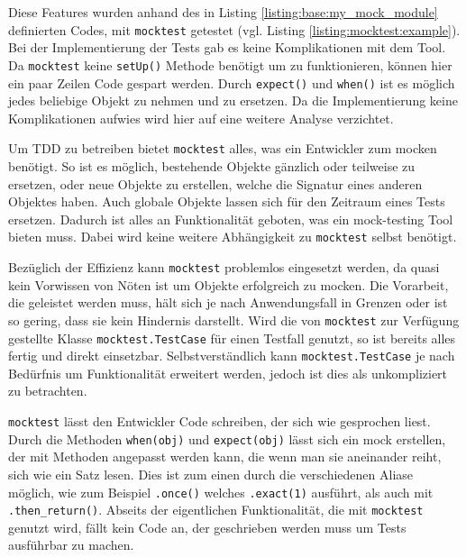Diese Features wurden anhand des in Listing \ref{listing:base:my_mock_module}
definierten Codes, mit \lstinline{mocktest} getestet (vgl. Listing
\ref{listing:mocktest:example}). Bei der Implementierung der Tests gab es keine
Komplikationen mit dem Tool. Da \lstinline{mocktest} keine \lstinline{setUp()}
Methode benötigt um zu funktionieren, können hier ein paar Zeilen Code gespart
werden. Durch \lstinline{expect()} und \lstinline{when()} ist es möglich jedes
beliebige Objekt zu nehmen und zu ersetzen. Da die Implementierung keine
Komplikationen aufwies wird hier auf eine weitere Analyse verzichtet.
\newline

Um TDD zu betreiben bietet \lstinline{mocktest} alles, was ein Entwickler zum
\Gls{mock}en benötigt. So ist es möglich, bestehende Objekte gänzlich oder
teilweise zu ersetzen, oder neue Objekte zu erstellen, welche die Signatur eines
anderen Objektes haben. Auch globale Objekte lassen sich für den Zeitraum eines
Tests ersetzen. Dadurch ist alles an Funktionalität geboten, was ein
\gls{mock}-testing Tool bieten muss. Dabei wird keine weitere Abhängigkeit zu
\lstinline{mocktest} selbst benötigt.

Bezüglich der Effizienz kann \lstinline{mocktest} problemlos eingesetzt werden,
da quasi kein Vorwissen von Nöten ist um Objekte erfolgreich zu \gls{mock}en.
Die Vorarbeit, die geleistet werden muss, hält sich je nach Anwendungsfall in
Grenzen oder ist so gering, dass sie kein Hindernis darstellt. Wird die von
\lstinline{mocktest} zur Verfügung gestellte Klasse
\lstinline{mocktest.TestCase} für einen Testfall genutzt, so ist bereits alles
fertig und direkt einsetzbar. Selbstverständlich kann
\lstinline{mocktest.TestCase} je nach Bedürfnis um Funktionalität erweitert
werden, jedoch ist dies als unkompliziert zu betrachten.

\lstinline{mocktest} lässt den Entwickler Code schreiben, der sich wie
gesprochen liest. Durch die Methoden \lstinline{when(obj)} und
\lstinline{expect(obj)} lässt sich ein \Gls{mock} erstellen, der mit Methoden
angepasst werden kann, die wenn man sie aneinander reiht, sich wie ein Satz
lesen. Dies ist zum einen durch die verschiedenen Aliase möglich, wie zum
Beispiel \lstinline{.once()} welches \lstinline{.exact(1)} ausführt, als auch
mit \lstinline{.then_return()}. Abseits der eigentlichen Funktionalität, die
mit \lstinline{mocktest} genutzt wird, fällt kein Code an, der geschrieben
werden muss um Tests ausführbar zu machen.
